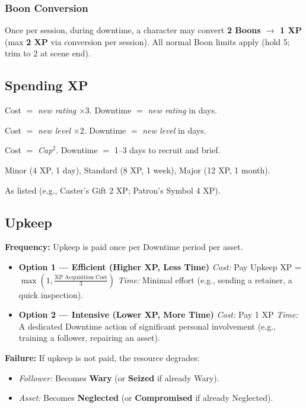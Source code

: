 \subsubsection{Boon Conversion}
Once per session, during downtime, a character may convert \textbf{2 Boons $\rightarrow$ 1 XP} (max \textbf{2 XP} via conversion per session). All normal Boon limits apply (hold 5; trim to 2 at scene end).

\subsection{Spending XP}
\label{sec:spendingxp}
\begin{description}[leftmargin=1.5em, style=nextline]
  \item[Attributes:] Cost $=$ \emph{new rating} $\times 3$. Downtime $=$ \emph{new rating} in days.
  \item[Skills:] Cost $=$ \emph{new level} $\times 2$. Downtime $=$ \emph{new level} in days.
  \item[On-Screen Followers:] Cost $=$ \emph{Cap}$^2$. Downtime $=$ 1--3 days to recruit and brief.
  \item[Off-Screen Assets:] Minor (4 XP, 1 day), Standard (8 XP, 1 week), Major (12 XP, 1 month).
  \item[Talents/Minor Assets:] As listed (e.g., Caster's Gift 2 XP; Patron's Symbol 4 XP).
\end{description}

\subsection*{Upkeep}

\textbf{Frequency:} Upkeep is paid once per Downtime period per asset.

\begin{itemize}
  \item \textbf{Option 1 — Efficient (Higher XP, Less Time)}
  \emph{Cost:} Pay Upkeep XP = $\max(1, \frac{\text{XP Acquisition Cost}}{3})$
  \emph{Time:} Minimal effort (e.g., sending a retainer, a quick inspection).

  \item \textbf{Option 2 — Intensive (Lower XP, More Time)}
  \emph{Cost:} Pay 1 XP
  \emph{Time:} A dedicated Downtime action of significant personal involvement (e.g., training a follower, repairing an asset).
\end{itemize}

\textbf{Failure:} If upkeep is not paid, the resource degrades:
\begin{itemize}
  \item \emph{Follower:} Becomes \textbf{Wary} (or \textbf{Seized} if already Wary).
  \item \emph{Asset:} Becomes \textbf{Neglected} (or \textbf{Compromised} if already Neglected).
\end{itemize}

